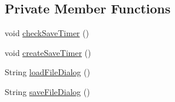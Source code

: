 \subsection*{Private Member Functions}
\begin{DoxyCompactItemize}
\item 
void \hyperlink{class_web_analyzer_1_1_u_i_1_1_interaction_objects_1_1_experiment_object_a0ccb4957ecd33c93abb3de68ea372b56}{check\+Save\+Timer} ()
\item 
void \hyperlink{class_web_analyzer_1_1_u_i_1_1_interaction_objects_1_1_experiment_object_a43412850f157306eed89cb600c7e8cec}{create\+Save\+Timer} ()
\item 
String \hyperlink{class_web_analyzer_1_1_u_i_1_1_interaction_objects_1_1_experiment_object_a496179a7d5d2ebc88beb1790e2258c8f}{load\+File\+Dialog} ()
\item 
String \hyperlink{class_web_analyzer_1_1_u_i_1_1_interaction_objects_1_1_experiment_object_a80ffb6140ccb91ccee84ccf9d67967cf}{save\+File\+Dialog} ()
\end{DoxyCompactItemize}
